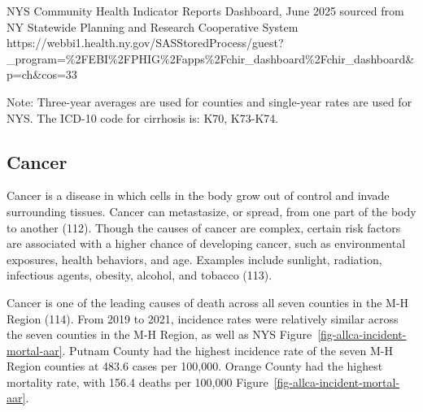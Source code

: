 \documentclass[
  english,
  letterpaper,
]{report}
\begin{document}
\begin{tcolorbox}[enhanced jigsaw, breakable, leftrule=.75mm, title=\textcolor{quarto-callout-note-color}{\faInfo}\hspace{0.5em}{Source}, bottomrule=.15mm, opacityback=0, left=2mm, colback=white, bottomtitle=1mm, coltitle=black, colbacktitle=quarto-callout-note-color!10!white, colframe=quarto-callout-note-color-frame, opacitybacktitle=0.6, toptitle=1mm, titlerule=0mm, arc=.35mm, rightrule=.15mm, toprule=.15mm]

NYS Community Health Indicator Reports Dashboard, June 2025 sourced from
NY Statewide Planning and Research Cooperative System
https://webbi1.health.ny.gov/SASStoredProcess/guest?\_program=\%2FEBI\%2FPHIG\%2Fapps\%2Fchir\_dashboard\%2Fchir\_dashboard\&p=ch\&cos=33

\end{tcolorbox}

\begin{tcolorbox}[enhanced jigsaw, breakable, leftrule=.75mm, title=\textcolor{quarto-callout-note-color}{\faInfo}\hspace{0.5em}{Note}, bottomrule=.15mm, opacityback=0, left=2mm, colback=white, bottomtitle=1mm, coltitle=black, colbacktitle=quarto-callout-note-color!10!white, colframe=quarto-callout-note-color-frame, opacitybacktitle=0.6, toptitle=1mm, titlerule=0mm, arc=.35mm, rightrule=.15mm, toprule=.15mm]

Note: Three-year averages are used for counties and single-year rates
are used for NYS. The ICD-10 code for cirrhosis is: K70, K73-K74.

\end{tcolorbox}

\subsection{Cancer}\label{cancer}

Cancer is a disease in which cells in the body grow out of control and
invade surrounding tissues. Cancer can metastasize, or spread, from one
part of the body to another (112). Though the causes of cancer are
complex, certain risk factors are associated with a higher chance of
developing cancer, such as environmental exposures, health behaviors,
and age. Examples include sunlight, radiation, infectious agents,
obesity, alcohol, and tobacco (113).

Cancer is one of the leading causes of death across all seven counties
in the M-H Region (114). From 2019 to 2021, incidence rates were
relatively similar across the seven counties in the M-H Region, as well
as NYS Figure~\ref{fig-allca-incident-mortal-aar}. Putnam County had the
highest incidence rate of the seven M-H Region counties at 483.6 cases
per 100,000. Orange County had the highest mortality rate, with 156.4
deaths per 100,000 Figure~\ref{fig-allca-incident-mortal-aar}.
\end{document}
